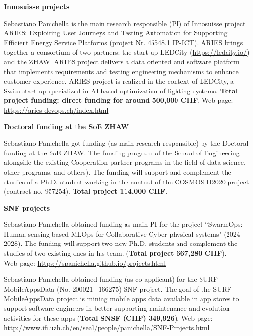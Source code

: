 \documentclass[11pt]{article}
\newcommand{\ra}{$\rightarrow$}
\newcommand{\chg}[2]{\textcolor{red}{\sout{#1}}{\ra}\textcolor{blue}{\uline{#2}}} %
\newcommand{\chg}[2]{#2}
\begin{document}
\medskip 
\textbf{Innosuisse projects}
\begin{innerlist}
   \item Sebastiano Panichella is the main research responsible (PI) of Innosuisse project ARIES: Exploiting User Journeys and Testing Automation for Supporting Efficient Energy Service Platforms (project Nr. 45548.1 IP-ICT).
ARIES brings together a consortium of two partners: the start-up LEDCity (\href{https://ledcity.io/}{https://ledcity.io/}) and the ZHAW. 
ARIES project delivers a data oriented and software platform that implements requirements and testing engineering mechanisms to enhance customer experience. ARIES project is realized in the context of LEDCity, a Swiss start-up specialized in AI-based optimization of lighting systems.
\textbf{Total project funding: direct funding for around \textbf{500,000 CHF}}. Web page: \href{https://aries-devops.ch/index.html}{https://aries-devops.ch/index.html}
\end{innerlist}
\medskip 
\textbf{Doctoral funding at the SoE ZHAW}
\begin{innerlist}
   \item Sebastiano Panichella got funding (as main research responsible) by the Doctoral funding at the SoE ZHAW.
The funding program of the School of Engineering alongside the existing Cooperation partner programs in the field of data science, other programs, and others).
The funding will support and complement the studies of a Ph.D. student working in the context of the COSMOS H2020 project (contract no. 957254).
\textbf{Total project 114,000 CHF}. 
\end{innerlist}
\medskip
\textbf{SNF projects}
\begin{innerlist}
   \item Sebastiano Panichella obtained funding as main PI for
   the project ``SwarmOps: Human-sensing based MLOps for Collaborative Cyber-physical systems" (2024-2028). The funding will support two new Ph.D. students and complement the studies of two existing ones in his team. (\textbf{Total project 667,280 CHF}). \\Web page: \href{https://spanichella.github.io/projects.html}{https://spanichella.github.io/projects.html}
   \item Sebastiano Panichella obtained funding  (as co-applicant) for
   the SURF-MobileAppsData  (No. 200021$-$166275) SNF project. The goal of the SURF-MobileAppsData project is mining mobile apps data available in app stores to support software engineers in better supporting maintenance and evolution activities for these apps (\textbf{Total SNSF (CHF) 349,926}). Web page: \href{http://www.ifi.uzh.ch/en/seal/people/panichella/SNF-Projects.html}{http://www.ifi.uzh.ch/en/seal/people/panichella/SNF-Projects.html}
\end{innerlist}
\end{document}
